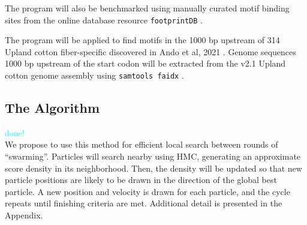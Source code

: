 \documentclass{article}
\begin{document}
  The program will also be benchmarked using manually curated motif binding sites from the online database resource \texttt{footprintDB} \cite{sebastian2014footprintdb}.  

  The program will be applied to find motifs in the 1000 bp upstream of 314 Upland cotton fiber-specific discovered in Ando et al, 2021 \cite{ando2021lcm}. Genome sequences 1000 bp upstream of the start codon will be extracted from the v2.1 Upland cotton genome assembly \cite{chen2020genomic} using \texttt{samtools faidx} \cite{li2009sequence}.
\subsection{The Algorithm}
\textcolor{cyan}{done!} \\
  We propose to use this method for efficient local search between rounds of ``swarming''. Particles will search nearby using HMC, generating an approximate score density in its neighborhood. Then, the density will be updated so that new particle positions are likely to be drawn in the direction of the global best particle. A new position and velocity is drawn for each particle, and the cycle repeats until finishing criteria are met. Additional detail is presented in the Appendix.
\end{document}
